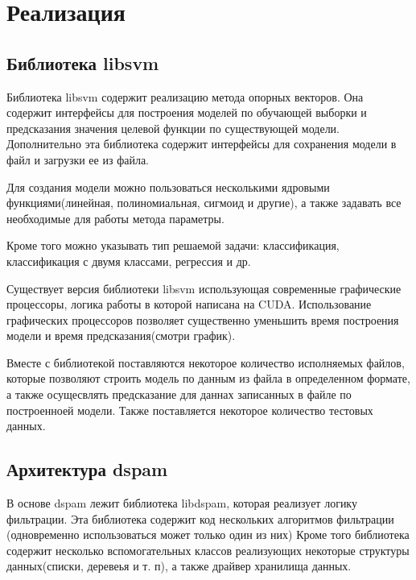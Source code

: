 \newpage
\section{Реализация}

\subsection{Библиотека libsvm}
Библиотека libsvm содержит реализацию метода опорных векторов. Она содержит интерфейсы для построения моделей по обучающей выборки и предсказания значения целевой функции по  существующей модели. Дополнительно эта библиотека содержит интерфейсы для сохранения модели в файл и загрузки ее из файла.

Для создания модели можно пользоваться несколькими ядровыми функциями(линейная, полиномиальная, сигмоид и другие), а также задавать все необходимые для работы метода параметры.

Кроме того можно указывать тип решаемой задачи: классификация, классификация с двумя классами, регрессия и др.

Существует версия библиотеки libsvm использующая современные графические процессоры, логика работы в которой написана на CUDA. Использование графических процессоров позволяет существенно уменьшить время построения модели и время предсказания(смотри график).

Вместе с библиотекой поставляются некоторое количество исполняемых файлов, которые позволяют строить модель по данным из файла в определенном формате, а также осущесвлять предсказание для даннах записанных в файле по построенноей модели. Также поставляется некоторое количество тестовых данных.

\subsection{Архитектура dspam}
В основе dspam лежит библиотека libdspam, которая реализует логику фильтрации.
Эта библиотека содержит код нескольких алгоритмов фильтрации (одновременно использоваться может только один из них)
Кроме того библиотека содержит несколько вспомогательных классов реализующих некоторые структуры данных(списки, деревеья и т. п), а также драйвер хранилища данных.

